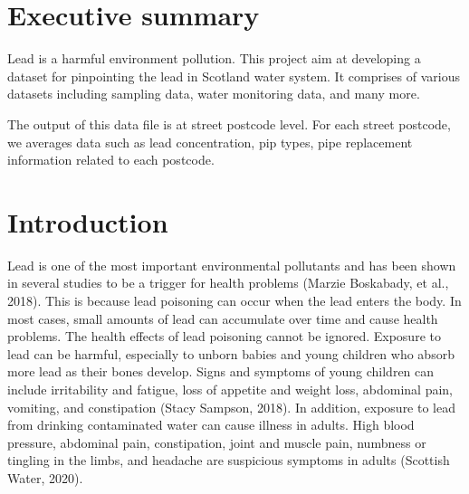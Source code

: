 \documentclass[11pt,twoside]{article}
\numberwithin{Theorem}{section}
\numberwithin{Definition}{section}
\numberwithin{Lemma}{section}
\numberwithin{Algorithm}{section}
\numberwithin{equation}{section}
\begin{document}
\cleardoublepage

\setcounter{page}{1}


\clearpage

\section*{Executive summary}
\label{sec.summary}
Lead is a harmful environment pollution.
This project aim at developing a dataset for pinpointing
the lead in Scotland water system.
It comprises of various datasets including sampling data,
water monitoring data, and many more.

The output of this data file is at street postcode level.
For each street postcode,
we averages data such as lead concentration, pip types,
pipe replacement information related to each postcode.

\clearpage

\section{Introduction}
\label{sec.intro}
Lead is one of the most important environmental pollutants and has been shown in several studies to be a trigger for health problems (Marzie Boskabady, et al., 2018). This is because lead poisoning can occur when the lead enters the body. In most cases, small amounts of lead can accumulate over time and cause health problems. The health effects of lead poisoning cannot be ignored. Exposure to lead can be harmful, especially to unborn babies and young children who absorb more lead as their bones develop. Signs and symptoms of young children can include irritability and fatigue, loss of appetite and weight loss, abdominal pain, vomiting, and constipation (Stacy Sampson, 2018). In addition, exposure to lead from drinking contaminated water can cause illness in adults. High blood pressure, abdominal pain, constipation, joint and muscle pain, numbness or tingling in the limbs, and headache are suspicious symptoms in adults (Scottish Water, 2020).
\end{document}
